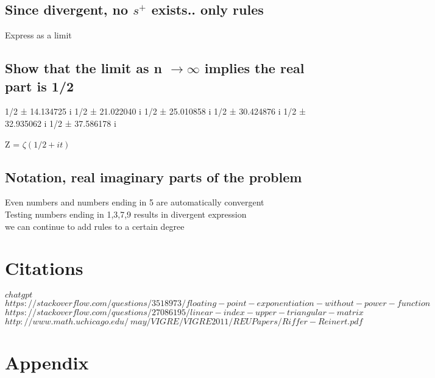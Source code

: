 \documentclass[11pt]{article}
\begin{document}
\subsection{Since divergent, no $s^{+}$ exists.. only rules}
Express as a limit

\subsection{Show that the limit as n $\rightarrow \infty$ implies the real part is 1/2}
1/2 ± 14.134725 i
1/2 ± 21.022040 i
1/2 ± 25.010858 i
1/2 ± 30.424876 i
1/2 ± 32.935062 i
1/2 ± 37.586178 i

Z = $\zeta(1/2 + it)$

\subsection{Notation, real imaginary parts of the problem}
Even numbers and numbers ending in 5 are automatically convergent\\
Testing numbers ending in 1,3,7,9 results in divergent expression\\
we can continue to add rules to a certain degree









\newpage
\section*{Citations}

\rbrack \hspace{1mm} $chatgpt$\\
\rbrack \hspace{1mm} $https://stackoverflow.com/questions/3518973/floating-point-exponentiation-without-power-function$\\
 \rbrack \hspace{1mm} $https://stackoverflow.com/questions/27086195/linear-index-upper-triangular-matrix$\\
\rbrack \hspace{1mm} $http://www.math.uchicago.edu/~may/VIGRE/VIGRE2011/REUPapers/Riffer-Reinert.pdf$









\newpage
\section*{Appendix}
\end{document}
